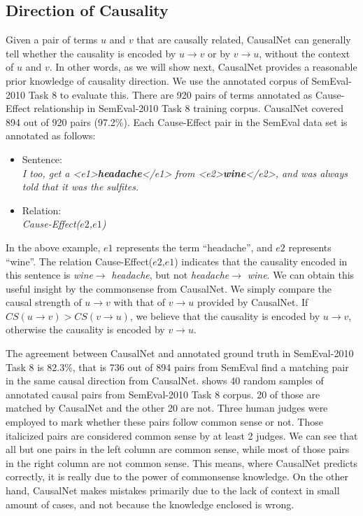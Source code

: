 \subsection{Direction of Causality}
%
%
Given a pair of terms $u$ and $v$ that are causally related,
CausalNet can generally tell whether the causality is encoded by $u
\rightarrow v$ or by $v \rightarrow u$, without the context of
$u$ and $v$. In other words, as we will show next, CausalNet
provides a reasonable prior knowledge of causality direction.
We use the annotated corpus of SemEval-2010 Task 8 to evaluate this.
There are 920 pairs of terms annotated as Cause-Effect relationship in
SemEval-2010 Task 8 training corpus. CausalNet covered 894 out of
920 pairs (97.2\%). Each Cause-Effect pair in the SemEval data set is
annotated as follows:
\begin{itemize}
  \item[] Sentence:\\
  \emph{I too, get a <e1>\textbf{headache}</e1> from
  <e2>\textbf{wine}</e2>, and was always told that it was the sulfites.}
  \item[] Relation: \\ \emph{Cause-Effect($e2$,$e1$)}
\end{itemize}
In the above example, $e1$ represents the term ``headache'', and
$e2$ represents ``wine''. The relation Cause-Effect($e2$,$e1$)
indicates that the causality encoded in this sentence is
\emph{wine}$\rightarrow$ \emph{headache}, but not
\emph{headache}$\rightarrow$ \emph{wine}. We can obtain this useful
insight by the commonsense from CausalNet.
We simply compare the causal strength of
$u \rightarrow v$ with that of $v \rightarrow u$ provided by
CausalNet. If $CS(u \rightarrow v) > CS(v \rightarrow u)$, we
believe that the causality is encoded by $u \rightarrow v$,
otherwise the causality is encoded by $v \rightarrow u$.

The agreement between CausalNet and annotated ground truth in SemEval-2010
Task 8 is 82.3\%, that is 736 out of 894 pairs from SemEval find a matching
pair in the same causal direction from CausalNet.
 shows 40 random samples of annotated causal pairs
from SemEval-2010 Task 8 corpus. 20 of those are matched by
CausalNet and the other 20 are not. Three human judges were employed to
mark whether these pairs follow common sense or not. Those italicized pairs
are considered common sense by at least 2 judges.
We can see that all but one pairs in the left column are common sense,
while most of those pairs in the right column are not common sense.
This means, where CausalNet predicts correctly, it is really due to the power
of commonsense knowledge. On the other hand, CausalNet makes mistakes primarily
due to the lack of context in small amount of cases, and not because the
knowledge enclosed is wrong.

